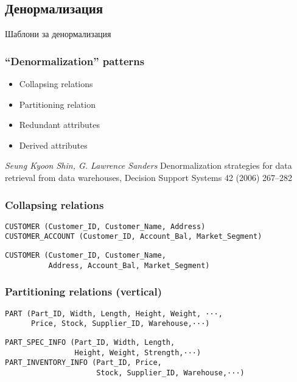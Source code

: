 \documentclass{beamer}
\begin{document}
\subsection{Денормализация}

\begin{frame}
\centerline{Шаблони за денормализация}
\end{frame}


\begin{frame}[fragile]
\frametitle{``Denormalization'' patterns}


\begin{itemize}
  \item Collapsing relations
  \item Partitioning relation
  \item Redundant attributes
  \item Derived attributes
\end{itemize}

\vspace{\baselineskip}
\vspace{\baselineskip}

\textit {Seung Kyoon Shin, G. Lawrence Sanders} Denormalization strategies for data retrieval from data warehouses, Decision Support Systems 42 (2006) 267–282

\end{frame}


\begin{frame}[fragile]
\frametitle{Collapsing relations}

\begin{verbatim}
CUSTOMER (Customer_ID, Customer_Name, Address)
CUSTOMER_ACCOUNT (Customer_ID, Account_Bal, Market_Segment)
\end{verbatim}

\vspace{\baselineskip}

\begin{verbatim}
CUSTOMER (Customer_ID, Customer_Name,
          Address, Account_Bal, Market_Segment)
\end{verbatim}

\end{frame}


\begin{frame}[fragile]
\frametitle{Partitioning relations (vertical)}


\begin{verbatim}
PART (Part_ID, Width, Length, Height, Weight, ···,
      Price, Stock, Supplier_ID, Warehouse,···)
\end{verbatim}

\vspace{\baselineskip}

\begin{verbatim}
PART_SPEC_INFO (Part_ID, Width, Length,
                Height, Weight, Strength,···)
PART_INVENTORY_INFO (Part_ID, Price,
                     Stock, Supplier_ID, Warehouse,···)
\end{verbatim}

\end{frame}
\end{document}
